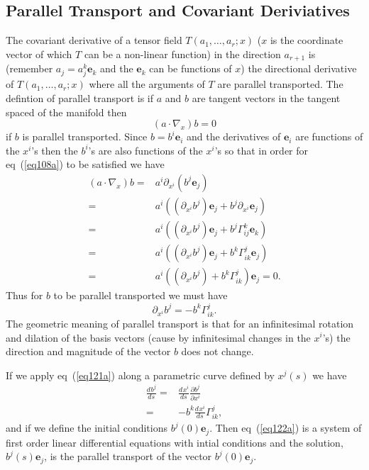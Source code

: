 \documentclass[12pt,twoside,openright]{memoir}
\newcommand{\bm}[1]{\boldsymbol{#1}}
\newcommand{\bfrac}[2]{\displaystyle\frac{#1}{#2}}
\newcommand{\lp}{\left (}
\newcommand{\rp}{\right )}
\newcommand{\pdiff}[2]{\bfrac{\partial {#1}}{\partial {#2}}}
\newcommand{\f}[2]{{#1}\lp {#2} \rp}
\newcommand{\paren}[1]{\lp {#1} \rp}
\newcommand{\deriv}[3]{\bfrac{d^{#3}#1}{d{#2}^{#3}}}
\newcommand{\be}{\begin{equation}}
\newcommand{\ee}{\end{equation}}
\newcommand{\eb}{\bm{e}}
\begin{document}
\subsection{Parallel Transport and Covariant Deriviatives}
The covariant derivative of a tensor field $\f{T}{a_{1},\dots,a_{r};x}$ ($x$ is the coordinate vector of which $T$ can be a non-linear function) in
the direction $a_{r+1}$ is (remember $a_{j} = a_{j}^{k}\eb_{k}$ and the $\eb_{k}$ can be functions of $x$) the directional derivative of 
$\f{T}{a_{1},\dots,a_{r};x}$ where all the arguments of $T$ are parallel transported. The defintion of parallel transport is if $a$ and $b$ are
tangent vectors in the tangent spaced of the manifold then
\be
	\paren{a\cdot\nabla_{x}}b = 0 \label{eq108a}
\ee
if $b$ is parallel transported.  Since $b = b^{i}\eb_{i}$ and the derivatives of $\eb_{i}$ are functions of the $x^{i}$'s then the $b^{i}$'s are
also functions of the $x^{i}$'s so that in order for eq~(\ref{eq108a}) to be satisfied we have
\begin{align}
	\paren{a\cdot\nabla_{x}}b =& a^{i}\partial_{x^{i}}\paren{b^{j}\eb_{j}} \nonumber \\
	                          =& a^{i}\paren{\paren{\partial_{x^{i}}b^{j}}\eb_{j} + b^{j}\partial_{x^{i}}\eb_{j}} \nonumber \\
	                          =& a^{i}\paren{\paren{\partial_{x^{i}}b^{j}}\eb_{j} + b^{j}\Gamma_{ij}^{k}\eb_{k}} \nonumber \\
	                          =& a^{i}\paren{\paren{\partial_{x^{i}}b^{j}}\eb_{j} + b^{k}\Gamma_{ik}^{j}\eb_{j}}\nonumber \\
	                          =& a^{i}\paren{\paren{\partial_{x^{i}}b^{j}} + b^{k}\Gamma_{ik}^{j}}\eb_{j} = 0.
\end{align}
Thus for $b$ to be parallel transported we must have
\be
	\partial_{x^{i}}b^{j} = -b^{k}\Gamma_{ik}^{j}. \label{eq121a}
\ee
The geometric meaning of parallel transport is that for an infinitesimal rotation and dilation of the basis vectors (cause by infinitesimal changes in the $x^{i}$'s) the direction and magnitude of the vector $b$ does not change.

If we apply eq~(\ref{eq121a}) along a parametric curve defined by $\f{x^{j}}{s}$ we have
\begin{align}
	\deriv{b^{j}}{s}{} =& \deriv{x^{i}}{s}{}\pdiff{b^{j}}{x^{i}} \nonumber \\
	                   =& -b^{k}\deriv{x^{i}}{s}{}\Gamma_{ik}^{j}, \label{eq122a}
\end{align}
and if we define the initial conditions $\f{b^{j}}{0}\eb_{j}$.  Then eq~(\ref{eq122a}) is a system of first order
linear differential equations with intial conditions and the solution, $\f{b^{j}}{s}\eb_{j}$, is the parallel transport of the
vector $\f{b^{j}}{0}\eb_{j}$.
\end{document}
